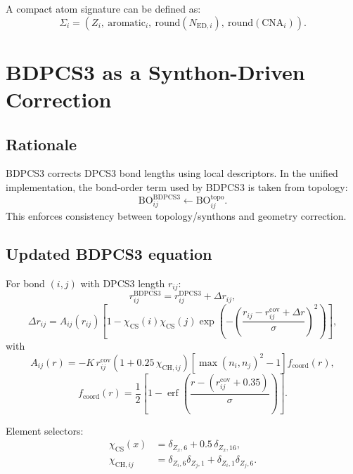 \documentclass[a4paper,11pt]{article}
\begin{document}
A compact atom signature can be defined as:
\begin{equation}
\Sigma_i=\left(Z_i,\ \mathrm{aromatic}_i,\ \mathrm{round}(N_{\mathrm{ED},i}),\ \mathrm{round}(\mathrm{CNA}_i)\right).
\end{equation}

\section{BDPCS3 as a Synthon-Driven Correction}
\subsection{Rationale}
BDPCS3 corrects DPCS3 bond lengths using local descriptors. In the unified implementation,
the bond-order term used by BDPCS3 is taken from topology:
\begin{equation}
\mathrm{BO}_{ij}^{\mathrm{BDPCS3}} \leftarrow \mathrm{BO}_{ij}^{\mathrm{topo}}.
\end{equation}
This enforces consistency between topology/synthons and geometry correction.

\subsection{Updated BDPCS3 equation}
For bond $(i,j)$ with DPCS3 length $r_{ij}$:
\begin{equation}
r_{ij}^{\mathrm{BDPCS3}} = r_{ij}^{\mathrm{DPCS3}}+\Delta r_{ij},
\end{equation}
\begin{equation}
\Delta r_{ij}
=A_{ij}(r_{ij})
\left[1-\chi_{\mathrm{CS}}(i)\chi_{\mathrm{CS}}(j)
\exp\!\left(-\left(\frac{r_{ij}-r^{\mathrm{cov}}_{ij}+\Delta r}{\sigma}\right)^2\right)\right],
\end{equation}
with
\begin{equation}
A_{ij}(r)
=-K\,r^{\mathrm{cov}}_{ij}
\left(1+0.25\,\chi_{\mathrm{CH},ij}\right)
\left[\max(n_i,n_j)^2-1\right]
f_{\mathrm{coord}}(r),
\end{equation}
\begin{equation}
f_{\mathrm{coord}}(r)=\frac{1}{2}\left[1-\operatorname{erf}\!\left(\frac{r-(r^{\mathrm{cov}}_{ij}+0.35)}{\sigma}\right)\right].
\end{equation}

Element selectors:
\begin{align}
\chi_{\mathrm{CS}}(x)&=\delta_{Z_x,6}+0.5\,\delta_{Z_x,16},\\
\chi_{\mathrm{CH},ij}&=\delta_{Z_i,6}\delta_{Z_j,1}+\delta_{Z_i,1}\delta_{Z_j,6}.
\end{align}
\end{document}
